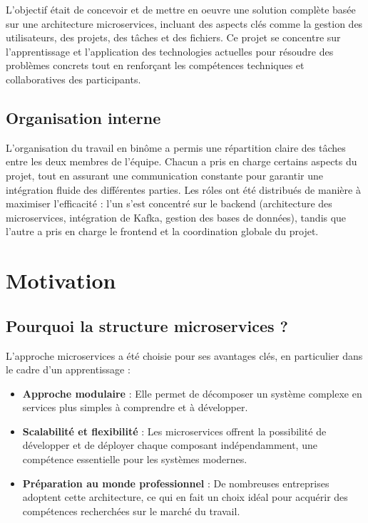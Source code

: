\documentclass[12pt,a4paper]{report}
\begin{document}
L'objectif \'etait de concevoir et de mettre en oeuvre une solution compl\`ete bas\'ee sur une architecture microservices, incluant des aspects cl\'es comme la gestion des utilisateurs, des projets, des t\^aches et des fichiers. Ce projet se concentre sur l'apprentissage et l'application des technologies actuelles pour r\'esoudre des probl\`emes concrets tout en renfor\c{c}ant les comp\'etences techniques et collaboratives des participants.

\subsection*{Organisation interne}
L'organisation du travail en bin\^ome a permis une r\'epartition claire des t\^aches entre les deux membres de l'\'equipe. Chacun a pris en charge certains aspects du projet, tout en assurant une communication constante pour garantir une int\'egration fluide des diff\'erentes parties. Les r\'oles ont \'et\'e distribu\'es de mani\`ere \`a maximiser l'efficacit\'e : l'un s'est concentr\'e sur le backend (architecture des microservices, int\'egration de Kafka, gestion des bases de donn\'ees), tandis que l'autre a pris en charge le frontend et la coordination globale du projet.

\newpage
\section{Motivation}
\subsection*{Pourquoi la structure microservices ?}
L'approche microservices a \'et\'e choisie pour ses avantages cl\'es, en particulier dans le cadre d'un apprentissage :
\begin{itemize}
    \item \textbf{Approche modulaire} : Elle permet de d\'ecomposer un syst\`eme complexe en services plus simples \`a comprendre et \`a d\'evelopper.
    \item \textbf{Scalabilit\'e et flexibilit\'e} : Les microservices offrent la possibilit\'e de d\'evelopper et de d\'eployer chaque composant ind\'ependamment, une comp\'etence essentielle pour les syst\`emes modernes.
    \item \textbf{Pr\'eparation au monde professionnel} : De nombreuses entreprises adoptent cette architecture, ce qui en fait un choix id\'eal pour acqu\'erir des comp\'etences recherch\'ees sur le march\'e du travail.
\end{itemize}
\end{document}
